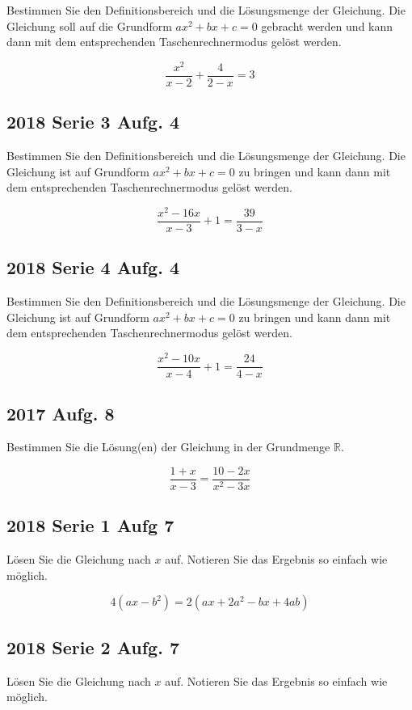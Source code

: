 Bestimmen Sie den Definitionsbereich und die Lösungsmenge der Gleichung.
Die Gleichung soll auf die Grundform $ax^2 + bx + c = 0$ gebracht werden und
kann dann mit dem entsprechenden Taschenrechnermodus gelöst werden.

$$\frac{x^2}{x-2} + \frac{4}{2-x} = 3$$


\subsection{2018 Serie 3 Aufg. 4}
Bestimmen Sie den Definitionsbereich und die Lösungsmenge der Gleichung.
Die Gleichung ist auf Grundform $ax^2 + bx + c = 0$ zu bringen und kann dann mit
dem entsprechenden Taschenrechnermodus gelöst werden.

$$\frac{x^2-16x}{x-3} + 1= \frac{39}{3-x} $$


\subsection{2018 Serie 4 Aufg. 4}
Bestimmen Sie den Definitionsbereich und die Lösungsmenge der Gleichung.
Die Gleichung ist auf Grundform $ax^2 + bx + c = 0$ zu bringen und kann dann
mit dem entsprechenden Taschenrechnermodus gelöst werden.

$$\frac{x^2 - 10x}{x-4}+1= \frac{24}{4-x}$$

\subsection{2017 Aufg. 8}

Bestimmen Sie die Lösung(en) der Gleichung in der Grundmenge
$\mathbb{R}$.

$$\frac{1+x}{x-3} = \frac{10-2x}{x^2-3x}$$



\subsection{2018 Serie 1 Aufg 7}

Lösen Sie die Gleichung nach $x$ auf.
Notieren Sie das Ergebnis so einfach wie möglich.

$$4(ax-b^2) = 2(ax+2a^2 -bx + 4ab)$$

\subsection{2018 Serie 2 Aufg. 7}

Lösen Sie die Gleichung nach $x$ auf. Notieren Sie das Ergebnis so einfach wie möglich.

